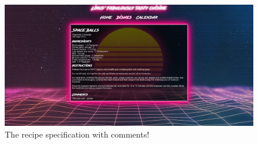 \documentclass[a4paper]{scrartcl}
\begin{document}
\begin{figure}[H]
  \begin{center}
    \includegraphics[scale=0.25]{images/Scr5.jpg}
    \caption{The recipe specification with comments!}
    \label{fig:recipe}
  \end{center}
\end{figure}
\end{document}
